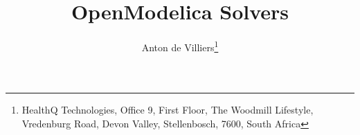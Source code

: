 \documentclass[10pt]{article}
\title{OpenModelica Solvers}
\author{Anton de Villiers\thanks{HealthQ Technologies, Office 9, First Floor, The Woodmill Lifestyle, Vredenburg Road, Devon Valley,
Stellenbosch, 7600, South Africa}}
\begin{document}
\setcounter{page}{1}



\newcommand{\blokkie}{\hspace{.07cm}\Box\hspace{.07cm}}

\newcommand{\headcol}{\rowcolor{tableheadcolor}}
\newcommand{\rowcol}{\rowcolor{tablerowcolor}}

\newcommand{\topline}{\arrayrulecolor{black}\specialrule{0.1em}{\abovetopsep}{0pt}%
	\arrayrulecolor{tableheadcolor}\specialrule{\belowrulesep}{0pt}{0pt}%
	\arrayrulecolor{black}}

\newcommand{\toplinee}{\arrayrulecolor{black}\specialrule{0.1em}{\abovetopsep}{0pt}%
	\arrayrulecolor{tablerowcolor}\specialrule{\belowrulesep}{0pt}{0pt}%
	\arrayrulecolor{black}}

\newcommand{\midline}{\arrayrulecolor{tableheadcolor}\specialrule{\aboverulesep}{0pt}{0pt}%
	\arrayrulecolor{black}\specialrule{\lightrulewidth}{0pt}{0pt}%
	\arrayrulecolor{white}\specialrule{\belowrulesep}{0pt}{0pt}%
	\arrayrulecolor{black}}

\newcommand{\midlinecbw}{\arrayrulecolor{tablerowcolor}\specialrule{\aboverulesep}{0pt}{0pt}%
	\arrayrulecolor{black}\specialrule{\lightrulewidth}{0pt}{0pt}%
 	\arrayrulecolor{white}\specialrule{\belowrulesep}{0pt}{0pt}%
	\arrayrulecolor{black}}

\newcommand{\midlinecw}{\arrayrulecolor{tablerowcolor}\specialrule{\aboverulesep}{0pt}{0pt}%
	\arrayrulecolor{tablerowcolor}\specialrule{\lightrulewidth}{0pt}{0pt}%
	\arrayrulecolor{white}\specialrule{\belowrulesep}{0pt}{0pt}%
	\arrayrulecolor{black}}

\newcommand{\midlinewbc}{\arrayrulecolor{white}\specialrule{\aboverulesep}{0pt}{0pt}%
	\arrayrulecolor{black}\specialrule{\lightrulewidth}{0pt}{0pt}%
	\arrayrulecolor{tablerowcolor}\specialrule{\belowrulesep}{0pt}{0pt}%
	\arrayrulecolor{black}}

\newcommand{\midlinehr}{\arrayrulecolor{tablerowcolor}\specialrule{\aboverulesep}{0pt}{0pt}%
	\arrayrulecolor{black}\specialrule{\lightrulewidth}{0pt}{0pt}%
	\arrayrulecolor{tableheadcolor}\specialrule{\belowrulesep}{0pt}{0pt}%
	\arrayrulecolor{tablerowcolor}}
\end{document}
